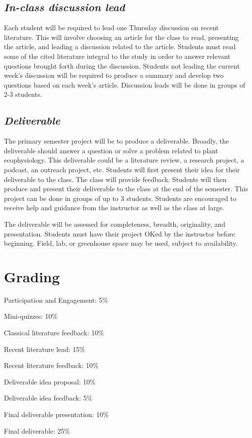 \documentclass[12pt, notitlepage]{article}   	%
\begin{document}
\subsection{\textit{In-class discussion lead}}
Each student will be required to lead one Thursday discussion on recent literature. 
This will involve choosing an article for the class to read, presenting the article, 
and leading a discussion related to the article. Students must read some of the cited
literature integral to the study 
in order to answer relevant questions brought forth during the discussion.
Students not leading the current week’s 
discussion will be required to produce a summary and 
develop two questions based on each week’s article.
Discussion leads will be done in groups of 2-3 students.

\subsection{\textit{Deliverable}}
The primary semester project will be to produce a deliverable.
Broadly, the deliverable should answer a question or solve a problem related 
to plant ecophysiology.
This deliverable could be a literature review, a research project, a podcast, 
an outreach project, etc. Students will first present their idea for their deliverable 
to the class. The class will provide feedback. Students will then produce and present 
their deliverable to the class at the end of the semester. This project can be done
in groups of up to 3 students. Students are encouraged to receive help and guidance 
from the instructor as well as the class at large. 

The deliverable will be assessed for completeness, breadth, originality, and presentation.
Students must have their project OKed by the instructor before beginning. Field, lab,
or greenhouse space may be used, subject to availability.

\section{Grading}
Participation and Engagement: 5\% \par
Mini-quizzes: 10\% \par
Classical literature feedback: 10\% \par
Recent literature lead: 15\% \par
Recent literature feedback: 10\% \par
Deliverable idea proposal: 10\% \par
Deliverable idea feedback: 5\% \par
Final deliverable presentation: 10\% \par
Final deliverable: 25\% \par
\end{document}
